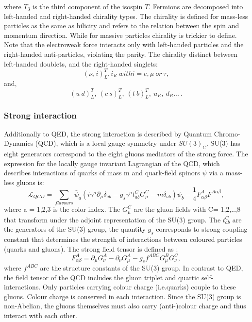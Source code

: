 where $T_3$ is the third component of the isospin $T$.
Fermions are decomposed into left-handed and right-handed chirality types. The chirality is defined for mass-less particles as the same as hilicity and refers to the relation between the spin and momentum direction. While for massive particles chirality is trickier to define. Note that the electroweak force interacts only with left-handed particles and the right-handed anti-particles, violating the parity. The chirality distinct between left-handed doublets, and the right-handed singlets:
\begin{equation}
    (\nu_i \ i)^T_L, i_R \ with i = e, \mu \ or \ \tau,
\end{equation}
and, 
\begin{equation}
    (u \ d)^T_L, \ (c \ s)^T_L, \ (t \ b)^T_L, \ u_R, \ d_R ... \ . 
\end{equation}

\subsubsection{Strong interaction}
Additionally to QED, the strong interaction is described by Quantum Chromo-Dynamics (QCD), which is a local gauge symmetry under $SU(3)_C$. SU(3) has eight generators correspond to the eight gluons mediators of the strong force. The expression for the locally gauge invariant Lagrangian of the QCD, which describes interactions of quarks of mass m and quark-field spinors $\psi$ via a mass-less gluons is:
\begin{equation}
    \mathcal{L}_{QCD} = \sum_{flavours} \bar{\psi}_a(i\gamma^\mu\partial_\mu\delta_{ab}-g_{s}\gamma^\mu t^C_{ab}G^C_\mu - m\delta_{ab})\psi_b - \frac{1}{4}F^A_{\alpha\beta}F^{A\alpha\beta},
\end{equation}
where a = 1,2,3 is the color index. The $G^{C}_\mu$ are the gluon fields with C= 1,2,..,8 that transform under the adjoint representation of the SU(3) group.  The $t^C_{ab}$ are the generators of the SU(3) group, the quantity $g_{s}$ corresponds to strong coupling constant that determines the strength of interactions between coloured particles (quarks and gluons). The strong field tensor is defined as :
\begin{equation}
    F^A_{\alpha\beta} = \partial_\mu G^A_\nu - \partial_\nu G^A_\mu - g_sf^{ABC}G^B_\mu G^C_\nu,
 \end{equation}
where $f^{ABC}$ are the structure constants of the SU(3) group. In contrast to QED, the field tensor of the QCD includes the gluon triplet and quartic self-interactions. Only particles carrying colour charge (i.e.quarks) couple to these gluons. Colour charge is conserved in each interaction. Since the SU(3) group is non-Abelian, the gluons themselves must also carry (anti-)colour charge and thus interact with each other. \\

